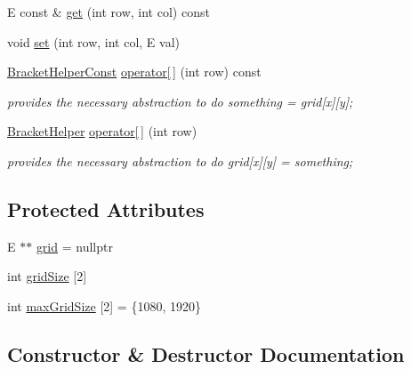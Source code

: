 \begin{DoxyCompactItemize}
E const  \& \mbox{\hyperlink{classbridges_1_1datastructure_1_1_grid_a1ff40a322e0c6407affb608366f895b6}{get}} (int row, int col) const
\item 
void \mbox{\hyperlink{classbridges_1_1datastructure_1_1_grid_ac0d4784a31f69d8cf4be38952730cfa8}{set}} (int row, int col, E val)
\item 
\mbox{\hyperlink{classbridges_1_1datastructure_1_1_grid_1_1_bracket_helper_const}{Bracket\+Helper\+Const}} \mbox{\hyperlink{classbridges_1_1datastructure_1_1_grid_a754a890728b6b268a1ba843da89cb1f6}{operator\mbox{[}$\,$\mbox{]}}} (int row) const
\begin{DoxyCompactList}\small\item\em provides the necessary abstraction to do something = grid\mbox{[}x\mbox{]}\mbox{[}y\mbox{]}; \end{DoxyCompactList}\item 
\mbox{\hyperlink{classbridges_1_1datastructure_1_1_grid_1_1_bracket_helper}{Bracket\+Helper}} \mbox{\hyperlink{classbridges_1_1datastructure_1_1_grid_ae5a7cf159c7918193ba75146660c3c1f}{operator\mbox{[}$\,$\mbox{]}}} (int row)
\begin{DoxyCompactList}\small\item\em provides the necessary abstraction to do grid\mbox{[}x\mbox{]}\mbox{[}y\mbox{]} = something; \end{DoxyCompactList}\end{DoxyCompactItemize}
\subsection*{Protected Attributes}
\begin{DoxyCompactItemize}
\item 
E $\ast$$\ast$ \mbox{\hyperlink{classbridges_1_1datastructure_1_1_grid_aa29a07fad530eacd55e6244471ec4ecb}{grid}} = nullptr
\item 
int \mbox{\hyperlink{classbridges_1_1datastructure_1_1_grid_a97738e6230af3e7e593e93ecfde0b731}{grid\+Size}} \mbox{[}2\mbox{]}
\item 
int \mbox{\hyperlink{classbridges_1_1datastructure_1_1_grid_acb1cca7db5fb42a0b107885f9e00ff67}{max\+Grid\+Size}} \mbox{[}2\mbox{]} = \{1080, 1920\}
\end{DoxyCompactItemize}


\subsection{Constructor \& Destructor Documentation}
\mbox{\label{classbridges_1_1datastructure_1_1_grid_a80d8bca9d3793d896a92168a54ce7b2b}} 
